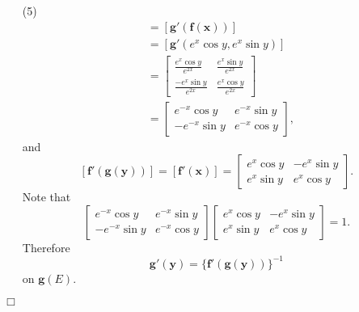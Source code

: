 \documentclass{article}
\begin{document}
\begin{enumerate}
\item[(5)]
  \begin{align*}
    [\mathbf{g}'(\mathbf{y})]
    &= [\mathbf{g}'(\mathbf{f}(\mathbf{x}))] \\
    &= [\mathbf{g}'(e^x \cos y, e^x \sin y)] \\
    &=
    \begin{bmatrix}
      \frac{e^x \cos y}{e^{2x}} & \frac{e^x \sin y}{e^{2x}} \\
      \frac{-e^x \sin y}{e^{2x}} & \frac{e^x \cos y}{e^{2x}}
    \end{bmatrix} \\
    &=
    \begin{bmatrix}
      e^{-x} \cos y & e^{-x} \sin y \\
      -e^{-x} \sin y & e^{-x} \cos y
    \end{bmatrix},
  \end{align*}
  and
  \[
    [\mathbf{f}'(\mathbf{g}(\mathbf{y}))]
    = [\mathbf{f}'(\mathbf{x})]
    =
    \begin{bmatrix}
      e^x \cos y & -e^x \sin y \\
      e^x \sin y &  e^x \cos y
    \end{bmatrix}.
  \]
  Note that
  \[
    \begin{bmatrix}
      e^{-x} \cos y & e^{-x} \sin y \\
      -e^{-x} \sin y & e^{-x} \cos y
    \end{bmatrix}
    \begin{bmatrix}
      e^x \cos y & -e^x \sin y \\
      e^x \sin y &  e^x \cos y
    \end{bmatrix}
    = 1.
  \]
  Therefore
  \[
    \mathbf{g}'(\mathbf{y})
    = \{ \mathbf{f}'(\mathbf{g}(\mathbf{y})) \}^{-1}
  \]
  on $\mathbf{g}(E)$.
\end{enumerate}
$\Box$ \\
\end{document}
